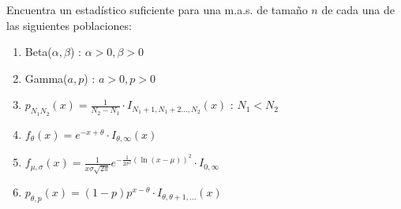 \begin{problem}{2.2}
	Encuentra un estadístico suficiente para una m.a.s. de tamaño $n$ de cada una de las siguientes poblaciones: 
	\begin{enumerate}
		\item Beta($\alpha, \beta$) : $\alpha > 0, \beta > 0$
		\item Gamma($a, p$) : $a > 0, p > 0$
		\item $p_{N_1 N_2}(x) = \frac{1}{N_2 - N_1} \cdot I_{N_1 + 1, N_1 +2 \ldots, N_2}(x)$ : $N_1 < N_2$
		\item $f_{\theta}(x) = e^{-x + \theta}\cdot I_{\theta, \infty}(x)$
		\item $f_{\mu, \sigma}(x) = \frac{1}{x\sigma\sqrt{2\pi}}e^{-\frac{1}{2\sigma^2}(\ln(x - \mu))^2}\cdot I_{0, \infty}$
		\item $p_{\theta, p}(x) = (1 - p)p^{x - \theta} \cdot I_{\theta, \theta + 1, \ldots }(x)$
	\end{enumerate}
\end{problem}
